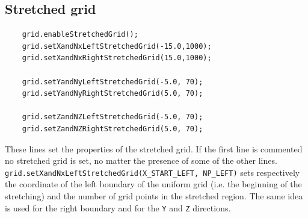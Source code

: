 \documentclass[11pt,a4paper]{report}
\begin{document}
\subsection{Stretched grid}\label{subsection_stretch}

\begin{lstlisting}
	grid.enableStretchedGrid();
	grid.setXandNxLeftStretchedGrid(-15.0,1000);
	grid.setXandNxRightStretchedGrid(15.0,1000);

	grid.setYandNyLeftStretchedGrid(-5.0, 70);
	grid.setYandNyRightStretchedGrid(5.0, 70);

	grid.setZandNZLeftStretchedGrid(-5.0, 70);
	grid.setZandNZRightStretchedGrid(5.0, 70);
\end{lstlisting}
These lines set the properties of the stretched grid.
If the first line is commented no stretched grid is set, no matter the presence of some of the other lines.
\texttt{grid.setXandNxLeftStretchedGrid(X\_START\_LEFT, NP\_LEFT)}
sets respectively the coordinate of the left boundary of the uniform grid (i.e. the beginning of the stretching) and the number of grid points in the stretched region.
The same idea is used for the right boundary and for the \verb+Y+ and \verb+Z+
directions.
\end{document}
